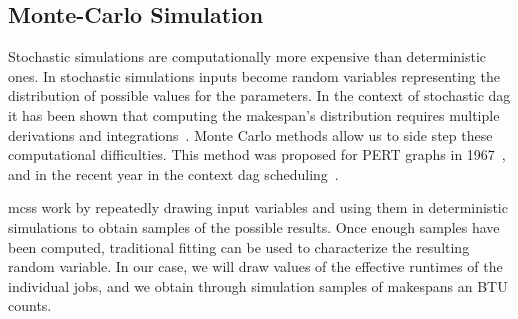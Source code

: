 \documentclass[10pt,conference,compsocconf]{IEEEtran}
\begin{document}
\subsection{Monte-Carlo Simulation}\label{sec:MCS}

Stochastic  simulations are  computationally more  expensive than  deterministic
ones. In stochastic simulations inputs  become random variables representing the
distribution of possible values for the parameters. In the context of stochastic
\ac{dag} it has  been shown that computing the  makespan's distribution requires
multiple derivations and  integrations~\cite{Ludwig01,Li97}. Monte Carlo methods
allow us to side step these computational difficulties. This method was proposed
for PERT  graphs in 1967~\cite{Slyke63}, and  in the recent year  in the context
\ac{dag} scheduling~\cite{Canon10,Zheng13}.

\aclp{mcs}  work  by  repeatedly  drawing  input variables  and  using  them  in
deterministic simulations to obtain samples of the possible results. Once enough
samples have been computed, traditional fitting  can be used to characterize the
resulting random  variable. In our  case, we will  draw values of  the effective
runtimes of  the individual jobs,  and we  obtain through simulation  samples of
makespans an BTU counts.
\end{document}
